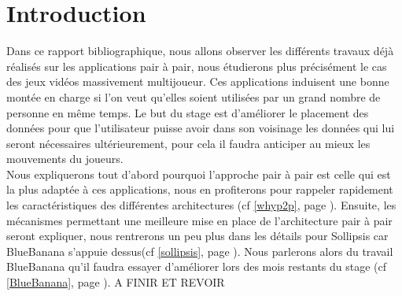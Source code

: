 \section{Introduction}
	Dans ce rapport bibliographique, nous allons observer les différents travaux déjà réalisés sur les applications pair à pair, nous étudierons plus précisément le cas des jeux vidéos massivement multijoueur. Ces applications induisent une bonne montée en charge si l'on veut qu'elles soient utilisées par un grand nombre de personne en même temps. Le but du stage est d'améliorer le placement des données pour que l'utilisateur puisse avoir dans son voisinage les données qui lui seront nécessaires ultérieurement, pour cela il faudra anticiper au mieux les mouvements du joueurs.\\
	Nous expliquerons tout d'abord pourquoi l'approche pair à pair est celle qui est la plus adaptée à ces applications, nous en profiterons pour rappeler rapidement les caractéristiques des différentes architectures (cf \ref{whyp2p}, page \pageref{whyp2p}). Ensuite, les mécanismes permettant une meilleure mise en place de l'architecture pair à pair seront expliquer, nous rentrerons un peu plus dans les détails pour Sollipsis car BlueBanana s'appuie dessus(cf \ref{sollipsis}, page \pageref{sollipsis}). Nous parlerons alors du travail BlueBanana qu'il faudra essayer d'améliorer lors des mois restants du stage (cf \ref{BlueBanana}, page \pageref{BlueBanana}). A FINIR ET REVOIR
